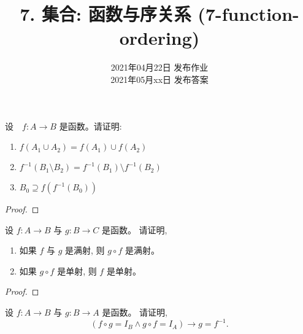 \documentclass[a4paper, justified]{tufte-handout}
\title{7. 集合: 函数与序关系 (7-function-ordering)}
\date{2021年04月22日 发布作业 \\ 2021年05月xx日 发布答案}
\begin{document}
\maketitle
\noplagiarism %
\begin{abstract}
\end{abstract}
\beginrequired

\begin{problem}[\score{7 = 2 + 2 + 3} $\star\star$]
  设　$f: A \to B$ 是函数。请证明:
  \begin{enumerate}[(1)]
    \item $f(A_1 \cup A_2) = f(A_1) \cup f(A_2)$
    \item $f^{-1}(B_1 \setminus B_2) = f^{-1}(B_1) \setminus f^{-1}(B_2)$
    \item $B_0 \supseteq f(f^{-1}(B_0))$
  \end{enumerate}
\end{problem}

\begin{proof}
\end{proof}

\begin{problem}[\score{4 = 2 + 2} $\star\star$]
  设 $f: A \to B$ 与 $g: B \to C$ 是函数。
  请证明,
  \begin{enumerate}[(1)]
    \item 如果 $f$ 与 $g$ 是满射, 则 $g \circ f$ 是满射。
    \item 如果 $g \circ f$ 是单射, 则 $f$ 是单射。
  \end{enumerate}
\end{problem}

\begin{proof}
\end{proof}

\begin{problem}
  设 $f: A \to B$ 与 $g: B \to A$ 是函数。
  请证明,
  \[
    (f \circ g = I_B \land g \circ f = I_A) \to g = f^{-1}.
  \]
\end{problem}
\end{document}
